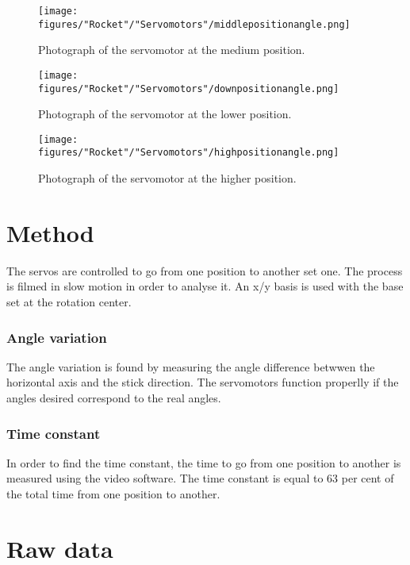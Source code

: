 \begin{figure} [htbp]
	\centering
	\texttt{[image: figures/"Rocket"/"Servomotors"/middlepositionangle.png]}
	\caption{Photograph of the servomotor at the medium position.} \label{fig:ServoInitialPosition}
\end{figure}

\begin{figure} [htbp]
	\centering
	\texttt{[image: figures/"Rocket"/"Servomotors"/downpositionangle.png]}
	\caption{Photograph of the servomotor at the lower position.} \label{fig:ServoLowPosition}
\end{figure}

\begin{figure} [htbp]
	\centering
	\texttt{[image: figures/"Rocket"/"Servomotors"/highpositionangle.png]}
	\caption{Photograph of the servomotor at the higher position.} \label{fig:ServoHighPosition}
\end{figure}


\section*{Method}

The servos are controlled to go from one position to another set one. The process is filmed in slow motion in order to analyse it. An x/y basis is used with the base set at the rotation center.

\subsubsection*{Angle variation}

The angle variation is found by measuring the angle difference betwwen the horizontal axis and the stick direction. The servomotors function properlly if the angles desired correspond to the real angles.

\subsubsection*{Time constant}

In order to find the time constant, the time to go from one position to another is measured using the video software. The time constant is equal to 63 per cent of the total time from one position to another. 



\section*{Raw data}

